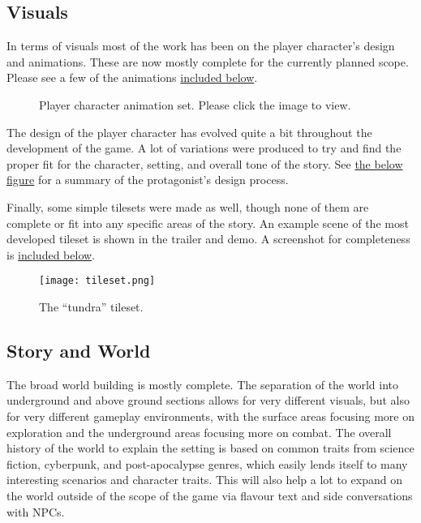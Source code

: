 \clearpage
\subsection{Visuals}
In terms of visuals most of the work has been on the player character's design and animations. These are now mostly complete for the currently planned scope. Please see a few of the animations \hyperref[fig:animations]{included below}.

\begin{figure}[h]
  \centering
  \caption{Player character animation set. Please click the image to view.}
  \label{fig:animations}
\end{figure}

The design of the player character has evolved quite a bit throughout the development of the game. A lot of variations were produced to try and find the proper fit for the character, setting, and overall tone of the story. See \hyperref[fig:designs]{the below figure} for a summary of the protagonist's design process.
\clearpage

Finally, some simple tilesets were made as well, though none of them are complete or fit into any specific areas of the story. An example scene of the most developed tileset is shown in the trailer and demo. A screenshot for completeness is \hyperref[fig:tileset]{included below}.

\begin{figure}[H]
  \centering
  \texttt{[image: tileset.png]}
  \label{fig:tileset}
  \caption{The ``tundra'' tileset.}
\end{figure}

\subsection{Story and World}
The broad world building is mostly complete. The separation of the world into underground and above ground sections allows for very different visuals, but also for very different gameplay environments, with the surface areas focusing more on exploration and the underground areas focusing more on combat. The overall history of the world to explain the setting is based on common traits from science fiction, cyberpunk, and post-apocalypse genres, which easily lends itself to many interesting scenarios and character traits. This will also help a lot to expand on the world outside of the scope of the game via flavour text and side conversations with NPCs. \\

